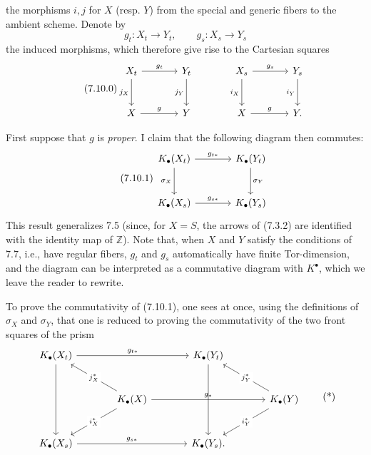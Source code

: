 the morphisms \(i,j\) for \(X\) (resp. \(Y\)) from the special and generic fibers to the ambient scheme. Denote by
\[
  g_t:X_t\to Y_t,\qquad g_s:X_s\to Y_s
\]
the induced morphisms, which therefore give rise to the Cartesian squares
\begin{equation}\tag{7.10.0}
\begin{tikzcd}[column sep=large,row sep=large]
X_t \arrow[r,"g_t"] \arrow[d,"j_X"'] & Y_t \arrow[d,"j_Y"'] &
X_s \arrow[r,"g_s"] \arrow[d,"i_X"'] & Y_s \arrow[d,"i_Y"']\\
X \arrow[r,"g"] & Y &
X \arrow[r,"g"] & Y .
\end{tikzcd}
\end{equation}

First suppose that \(g\) is \emph{proper}. I claim that the following diagram then commutes:
\begin{equation}\tag{7.10.1}
\begin{tikzcd}[column sep=large,row sep=large]
K_\bullet(X_t) \arrow[r,"g_{t*}"] \arrow[d,"\sigma_X"'] &
K_\bullet(Y_t) \arrow[d,"\sigma_Y"]\\
K_\bullet(X_s) \arrow[r,"g_{s*}"] &
K_\bullet(Y_s)
\end{tikzcd}
\end{equation}
This result generalizes 7.5 (since, for \(X=S\), the arrows of (7.3.2) are identified with the identity map of \(\mathbb Z\)). Note that, when \(X\) and \(Y\) satisfy the conditions of 7.7, i.e., have regular fibers, \(g_t\) and \(g_s\) automatically have finite Tor-dimension, and the diagram can be interpreted as a commutative diagram with \(K^\bullet\), which we leave the reader to rewrite.

To prove the commutativity of (7.10.1), one sees at once, using the definitions of \(\sigma_X\) and \(\sigma_Y\), that one is reduced to proving the commutativity of the two front squares of the prism
\[
\begin{tikzcd}[column sep=large,row sep=large]
K_\bullet(X_t) \arrow[rr,"g_{t*}"] \arrow[dd] && K_\bullet(Y_t) \arrow[dd]\\
& K_\bullet(X) \arrow[ul,"j_X^*" description] \arrow[dl,"i_X^*" description] \arrow[rr,"g_*"] &&
K_\bullet(Y) \arrow[ul,"j_Y^*" description] \arrow[dl,"i_Y^*" description]\\
K_\bullet(X_s) \arrow[rr,"g_{s*}"] && K_\bullet(Y_s).
\end{tikzcd}
\tag{*}
\]
